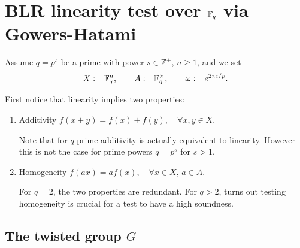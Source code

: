 \section{BLR linearity test over $\mathbb{F}_q$ via Gowers-Hatami}\label{sec:blr-finite-field}

Assume $q = p^s$ be a prime with power $s\in \mathbb{Z}^+$, $n \ge 1$, and we set
\[
X := \mathbb{F}_q^n, \qquad A := \mathbb{F}_q^\times, \qquad \omega := e^{2\pi i/p}.
\]


First notice that linearity implies two properties: 
\begin{enumerate}
    \item Additivity $f(x + y) = f(x) + f(y), \quad \forall x, y \in X$. 
    
    Note that for $q$ prime additivity is actually equivalent to linearity. However this is not the case for prime powers $q=p^s$ for $s > 1$.
    
    \item Homogeneity $f(a x) = a f(x), \quad \forall x \in X, \, a \in A$.

    For $q=2$, the two properties are redundant. 
    For $q > 2$, turns out testing homogeneity is crucial for a test to have a high soundness.
\end{enumerate}



\subsection{The twisted group \texorpdfstring{$G$}{G}}\label{sec:group}

